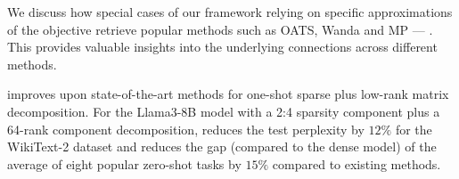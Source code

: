 \begin{compactitem}

    \item We discuss how special cases of our framework relying on specific approximations of the objective retrieve popular methods such as OATS, Wanda and MP --- \cite{zhang2024oats, sun2023simple,han2015learning, sze2020efficient}. This provides valuable insights into the underlying connections across different methods. 

    \item \ourframework improves upon state-of-the-art methods for one-shot sparse plus low-rank matrix decomposition. 
    For the Llama3-8B model with a 2:4 sparsity component plus a 64-rank component decomposition, \ourframework reduces the test perplexity by $12\%$ for the WikiText-2 dataset and reduces the gap (compared to the dense model) of the average of eight popular zero-shot tasks by $15\%$ compared to existing methods.
\end{compactitem}



